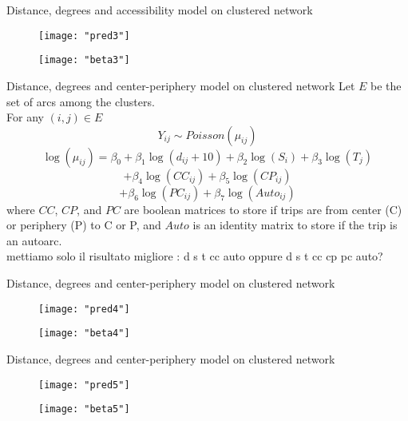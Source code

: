 \documentclass[pdf]{beamer}
\begin{document}
\begin{frame}{Distance, degrees and accessibility model on clustered network}
\begin{figure}
	\centering
	\texttt{[image: "pred3"]}
	\label{fig:bikesianmibellissimo-s-e-a-modificate}
\end{figure}
\begin{figure}
	\centering
	\texttt{[image: "beta3"]}
	\label{fig:bikesianmibellissimo-s-e-a-modificate}
\end{figure}
\end{frame}

\begin{frame}{Distance, degrees and center-periphery model on clustered network}
Let $E$ be the set of arcs among the clusters.\\[0.2cm]
For any $(i,j) \in E$
\[Y_{ij} \sim Poisson(\mu_{ij})\]
\[\log(\mu_{ij}) = \beta_0 + \beta_1 \log(d_{ij}+10) + \beta_2 \log(S_{i}) + \beta_3  \log(T_{j})  \]\[+ \beta_4 \log(CC_{ij}) + \beta_5 \log(CP_{ij})  \]\[+ \beta_6 \log(PC_{ij}) + \beta_7 \log(Auto_{ij})\]
where $CC$, $CP$, and $PC$ are boolean matrices to store if trips are from center (C) or periphery (P) to C or P, and $Auto$ is an identity matrix to store if the trip is an autoarc.\\

mettiamo solo il risultato migliore : d s t cc auto oppure d s t cc cp pc auto?
\end{frame}

\begin{frame}{Distance, degrees and center-periphery model on clustered network}
\begin{figure}
	\centering
	\texttt{[image: "pred4"]}
	\label{fig:bikesianmibellissimo-s-e-a-modificate}
\end{figure}
\begin{figure}
	\centering
	\texttt{[image: "beta4"]}
	\label{fig:bikesianmibellissimo-s-e-a-modificate}
\end{figure}
\end{frame}

\begin{frame}{Distance, degrees and center-periphery model on clustered network}
\begin{figure}
	\centering
	\texttt{[image: "pred5"]}
	\label{fig:bikesianmibellissimo-s-e-a-modificate}
\end{figure}
\begin{figure}
	\centering
	\texttt{[image: "beta5"]}
	\label{fig:bikesianmibellissimo-s-e-a-modificate}
\end{figure}
\end{frame}
\end{document}
